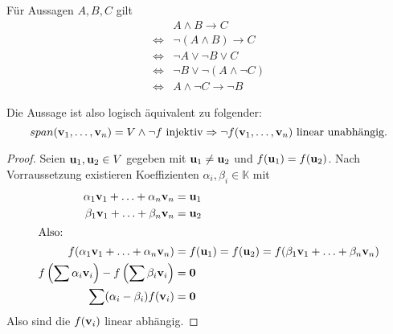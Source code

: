 \documentclass{../mfa}
\begin{document}
\subsection{}

Für Aussagen $A, B, C$ gilt 
\begin{align*}
   & A \wedge B  \rightarrow C \\
   \Leftrightarrow & \neg (A \wedge B)  \rightarrow C \\
   \Leftrightarrow & \neg A \vee \neg B  \vee C \\
   \Leftrightarrow & \neg B  \vee \neg (A \wedge \neg C) \\
   \Leftrightarrow & A \wedge \neg C  \rightarrow \neg B
\end{align*}

Die Aussage ist also logisch äquivalent zu folgender:
\begin{equation*}
   span(\mathbf{v}_{1}, \ldots, \mathbf{v}_{n}) = V \wedge \neg f~\text{injektiv} \Rightarrow \neg
   f(\mathbf{v}_{1}, \ldots, \mathbf{v}_{n}) ~\text{linear unabhängig.}
\end{equation*}

\begin{proof}
Seien $\mathbf{u}_1, \mathbf{u}_2 \in V$ gegeben mit $\mathbf{u}_1 \neq \mathbf{u}_2$ und
$f(\mathbf{u}_1) =
f(\mathbf{u}_2)$. Nach Vorraussetzung existieren Koeffizienten $\alpha_i, \beta_i \in
\mathbb{K}$ mit 
\begin{align*}
   \alpha_1 \mathbf{v}_{1} + \ldots + \alpha_n \mathbf{v}_{n} &= \mathbf{u}_1 \\
   \beta_1 \mathbf{v}_{1} + \ldots + \beta_n \mathbf{v}_{n} &= \mathbf{u}_2 \\
   \intertext{Also:}
   f(\alpha_1 \mathbf{v}_{1} + \ldots + \alpha_n \mathbf{v}_{n}) &= f(\mathbf{u}_1) = f(\mathbf{u}_2) =
   f(\beta_1 \mathbf{v}_{1} + \ldots + \beta_n \mathbf{v}_{n}) \\
   f\left(\sum \alpha_i \mathbf{v}_{i}\right) - f\left(\sum \beta_i \mathbf{v}_{i}\right) &= \mathbf{0} \\
   \sum (\alpha_i - \beta_i)f(\mathbf{v}_{i}) &= \mathbf{0}
\end{align*}
Also sind die $f(\mathbf{v}_{i})$ linear abhängig.
\end{proof}

\section{}
\end{document}
